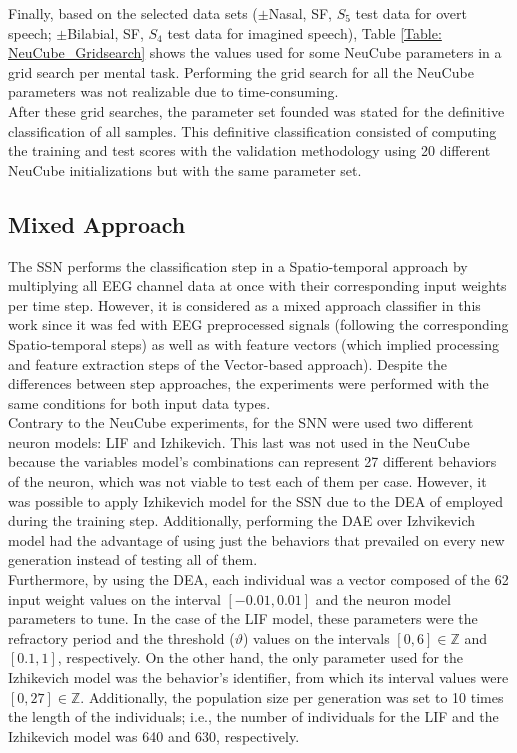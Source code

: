 Finally, based on the selected data sets ($\pm$Nasal, SF, $S_{5}$ test data for overt speech; $\pm$Bilabial, SF, $S_{4}$ test data for imagined speech), Table \ref{Table: NeuCube_Gridsearch} shows the values used for some NeuCube parameters in a grid search per mental task. Performing the grid search for all the NeuCube parameters was not realizable due to time-consuming.\\

After these grid searches, the parameter set founded was stated for the definitive \linebreak[4]classification of all samples. This definitive classification consisted of computing the training and test scores with the validation methodology using 20 different NeuCube initializations but with the same parameter set.

\subsection{Mixed Approach}
The SSN performs the classification step in a Spatio-temporal approach by multiplying all EEG channel data at once with their corresponding input weights per time step. However, it is considered as a mixed approach classifier in this work since it was fed with EEG preprocessed signals (following the corresponding Spatio-temporal steps) as well as with feature vectors (which implied processing and feature extraction steps of the Vector-based approach). Despite the differences between step approaches, the experiments were performed with the same conditions for both input data types.\\

Contrary to the NeuCube experiments, for the SNN were used two different neuron models: LIF and Izhikevich. This last was not used in the NeuCube because the variables model's combinations can represent 27 different behaviors of the neuron, which was not viable to test each of them per case. However, it was possible to apply Izhikevich model for the SSN due to the DEA of \cite{storn1997differential} employed during the training step. Additionally, performing the DAE over Izhvikevich model had the advantage of using just the behaviors that prevailed on every new generation instead of testing all of them.\\

Furthermore, by using the DEA, each individual was a vector composed of the 62 input weight values on the interval $[-0.01,0.01]$ and the neuron model parameters to tune. In the case of the LIF model, these parameters were the refractory period and the threshold ($\vartheta$) values on the intervals $[0,6] \in \mathbb{Z}$ and $[0.1,1]$, respectively. On the other hand, the only parameter used for the Izhikevich model was the behavior's identifier, from which its interval values were $[0,27] \in \mathbb{Z}$. Additionally, the population size per generation was set to 10 times the length of the individuals; i.e., the number of individuals for the LIF and the Izhikevich model was 640 and 630, respectively.\\


